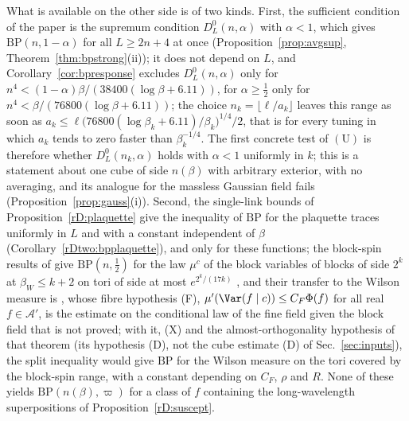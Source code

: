 \begin{remark}
What is available on the other side is of two kinds. First, the sufficient
condition of the paper is the supremum condition $D^0_L(n,\alpha)$ with
$\alpha<1$, which gives $\mathrm{BP}(n,1-\alpha)$ for all $L\ge2n+4$ at
once (Proposition~\ref{prop:avgsup}, Theorem~\ref{thm:bpstrong}(ii)); it
does not depend on $L$, and Corollary~\ref{cor:bpresponse} excludes
$D^0_L(n,\alpha)$ only for $n^4<(1-\alpha)\beta/(38400(\log\beta+6.11))$,
for $\alpha\ge\frac12$ only for $n^4<\beta/(76800(\log\beta+6.11))$; the
choice $n_k=\lfloor\ell/a_k\rfloor$ leaves this range as soon as $a_k\le
\ell\bigl(76800(\log\beta_k+6.11)/\beta_k\bigr)^{1/4}/2$, that is for every
tuning in which $a_k$ tends to zero faster than $\beta_k^{-1/4}$. The first
concrete test of $(\mathrm U)$ is therefore whether $D^0_L(n_k,\alpha)$
holds with $\alpha<1$ uniformly in $k$; this is a statement about one cube
of side $n(\beta)$ with arbitrary exterior, with no averaging, and its
analogue for the massless Gaussian field fails
(Proposition~\ref{prop:gauss}(i)). Second, the single-link
bounds of Proposition~\ref{rD:plaquette} give the inequality of
$\mathrm{BP}$ for the plaquette traces uniformly in $L$ and with a
constant independent of $\beta$ (Corollary~\ref{rDtwo:bpplaquette}),
and only for these functions; the
block-spin results of \cite[Sec.~X\,Q]{BBLR26} give $\mathrm{BP}(n,\frac12)$
for the law $\mu^c$ of the block variables of blocks of side $2^k$ at
$\beta_W\le k+2$ on tori of side at most $e^{2^k/(17k)}$
\cite[Corollary~166]{BBLR26}, and their transfer to the Wilson measure
is \cite[Theorem~114]{BBLR26}, whose fibre hypothesis (F),
$\mu'(\Var(f\mid c))\le C_F\Phi(f)$ for all real $f\in\mathcal A'$, is the
estimate on the conditional law of the fine field given the block field
that is not proved; with it, (X) and the almost-orthogonality hypothesis of
that theorem (its hypothesis (D), not the cube estimate (D) of
Sec.~\ref{sec:inputs}), the split inequality would give $\mathrm{BP}$ for
the Wilson measure on the tori covered by the block-spin range, with a
constant depending on $C_F$, $\rho$ and $R$. None of these yields $\mathrm{BP}(n(\beta),\varpi)$ for a class of
$f$ containing the long-wavelength superpositions of
Proposition~\ref{rD:suscept}.


\end{remark}
